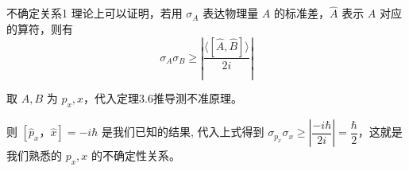 \begin{mythm}{不确定关系}{1}
	理论上可以证明，若用 $\sigma_A$ 表达物理量 $A$ 的标准差，$\hat{A}$ 表示 $A$ 对应的算符，则有
	\[
		\sigma_A \sigma_B \geqslant\left|\frac{\langle[\hat{A}, \hat{B}]\rangle}{2 i}\right|
	\]
\end{mythm}
\begin{example}
	取 $A, B$ 为 $p_x, x$，代入定理3.6推导测不准原理。
	\soln 

	\par 则 $\left[\hat{p}_x，\hat{x}\right]=-i \hbar$ 是我们已知的结果, 代入上式得到 $\sigma_{p_x} \sigma_x \geqslant\left|\dfrac{-i \hbar}{2 i}\right|=\dfrac{\hbar}{2}$，这就是我们熟悉的 $p_x, x$ 的不确定性关系。
\end{example}
